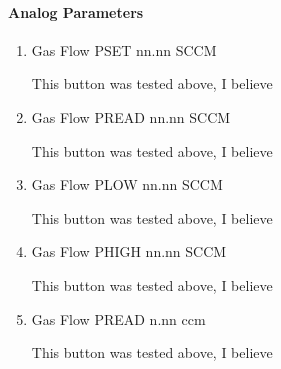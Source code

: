 \documentclass[11pt]{book}		%
\begin{document}
\paragraph{Analog Parameters}

\begin{enumerate}
 \item Gas Flow PSET   nn.nn SCCM

\color{red}
This button was tested above, I believe
\color{black}

 \item Gas Flow PREAD  nn.nn SCCM

\color{red}
This button was tested above, I believe
\color{black}

 \item Gas Flow PLOW   nn.nn SCCM

\color{red}
This button was tested above, I believe
\color{black}

 \item Gas Flow PHIGH  nn.nn SCCM

\color{red}
This button was tested above, I believe
\color{black}

 \item Gas Flow PREAD n.nn ccm

\color{red}
This button was tested above, I believe
\color{black}

\end{enumerate}
\end{document}
